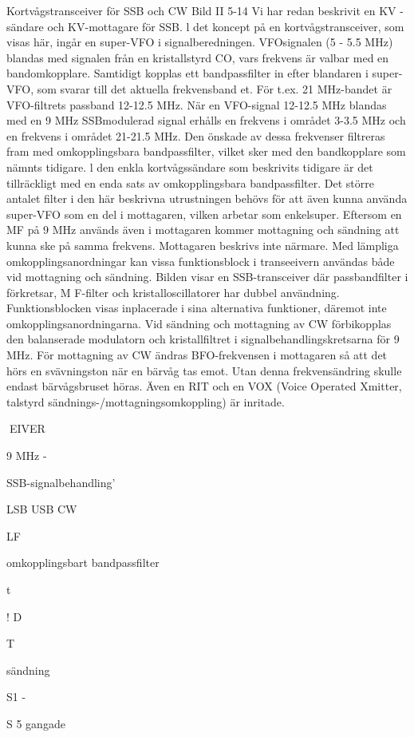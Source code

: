 {Kortvågstransceiver för SSB och CW
Bild II 5-14
Vi har redan beskrivit en KV -sändare och
KV-mottagare för SSB. l det koncept på en
kortvågstransceiver, som visas här, ingår
en super-VFO i signalberedningen. VFOsignalen (5 - 5.5 MHz) blandas med signalen från en kristallstyrd CO, vars frekvens är
valbar med en bandomkopplare. Samtidigt
kopplas ett bandpassfilter in efter blandaren
i super-VFO, som svarar till det aktuella
frekvensband et.
För t.ex. 21 MHz-bandet är VFO-filtrets
passband 12-12.5 MHz. När en VFO-signal
12-12.5 MHz blandas med en 9 MHz SSBmodulerad signal erhålls en frekvens i området 3-3.5 MHz och en frekvens i området
21-21.5 MHz. Den önskade av dessa frekvenser filtreras fram med omkopplingsbara
bandpassfilter, vilket sker med den bandkopplare som nämnts tidigare.
l den enkla kortvågssändare som beskrivits tidigare är det tillräckligt med en enda
sats av omkopplingsbara bandpassfilter. Det
större antalet filter i den här beskrivna utrustningen behövs för att även kunna använda super-VFO som en del i mottagaren,
vilken arbetar som enkelsuper. Eftersom en
MF på 9 MHz används även i mottagaren
kommer mottagning och sändning att kunna
ske på samma frekvens.
Mottagaren beskrivs inte närmare. Med
lämpliga omkopplingsanordningar kan vissa funktionsblock i transeeivern användas
både vid mottagning och sändning. Bilden
visar en SSB-transceiver där passbandfilter
i förkretsar, M F-filter och kristalloscillatorer
har dubbel användning. Funktionsblocken
visas inplacerade i sina alternativa funktioner, däremot inte omkopplingsanordningarna.
Vid sändning och mottagning av CW
förbikopplas den balanserade modulatorn
och kristallfiltret i signalbehandlingskretsarna för 9 MHz. För mottagning av CW ändras
BFO-frekvensen i mottagaren så att det
hörs en svävningston när en bärvåg tas
emot. Utan denna frekvensändring skulle
endast bärvågsbruset höras.
Även en RIT och en VOX (Voice Operated Xmitter, talstyrd sändnings-/mottagningsomkoppling) är inritade.

EIVER

9 MHz -

SSB-signalbehandling'

LSB USB CW

LF

omkopplingsbart
bandpassfilter

t

!
D

T

sändning

S1 -

S 5 gangade

}
